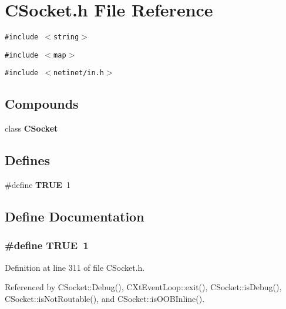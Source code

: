 \section{CSocket.h File Reference}
\label{CSocket_8h}
{\tt \#include $<$string$>$}\par
{\tt \#include $<$map$>$}\par
{\tt \#include $<$netinet/in.h$>$}\par
\subsection*{Compounds}
\begin{CompactItemize}
\item 
class {\bf CSocket}
\end{CompactItemize}
\subsection*{Defines}
\begin{CompactItemize}
\item 
\#define {\bf TRUE}\ 1
\end{CompactItemize}


\subsection{Define Documentation}
\subsubsection{\setlength{\rightskip}{0pt plus 5cm}\#define TRUE\ 1}\label{CSocket_8h_a0}




Definition at line 311 of file CSocket.h.

Referenced by CSocket::Debug(), CXt\-Event\-Loop::exit(), CSocket::is\-Debug(), CSocket::is\-Not\-Routable(), and CSocket::is\-OOBInline().